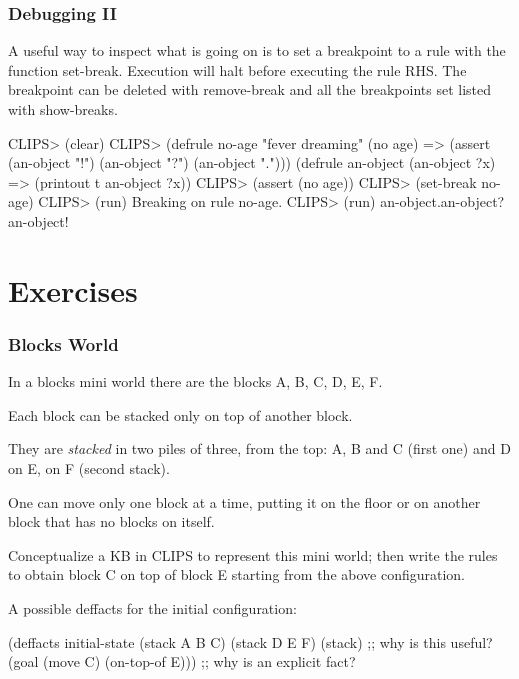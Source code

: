 \documentclass[xcolor={usenames,dvipsnames,svgnames}, compress]{beamer}
\begin{document}
\begin{frame}[fragile]
  \frametitle{Debugging II}
  A useful way to inspect what is going on is to set a breakpoint to a
  rule with the function \textsf{set-break}. Execution will halt
  before executing the rule RHS. The breakpoint can be deleted with
  \textsf{remove-break} and all the breakpoints set listed with
  \textsf{show-breaks}.
  \begin{clips-code}
    CLIPS> (clear)
    CLIPS> (defrule no-age
               "fever dreaming"
               (no age)
               =>
               (assert (an-object "!") (an-object "?") (an-object
               ".")))
           (defrule an-object
               (an-object ?x)
               =>
               (printout t an-object ?x))
   CLIPS> (assert (no age))
   CLIPS> (set-break no-age)
   CLIPS> (run)
   Breaking on rule no-age.
   CLIPS> (run)
   an-object.an-object?an-object!
  \end{clips-code}
\end{frame}

\section{ Exercises}
{
  \begin{frame}
    \sectionpage
  \end{frame}
}

\begin{frame}[fragile]
  \frametitle{Blocks World}
  In a blocks mini world there are the blocks A, B, C, D, E, F.\par
  Each block can be stacked only on top of another block.\par
  
  They are \emph{stacked} in two piles of three, from the top: A, B
  and C (first one) and D on E, on F (second stack).\par\bigskip

  One can move only one block at a time, putting it on the floor or on
  another block that has no blocks on itself.\par
  Conceptualize a KB in CLIPS to represent this mini world; then write
  the rules to obtain block C on top of block E starting from the
  above configuration.\bigskip

  A possible deffacts for the initial configuration:
  \begin{clips-code}[numbers=none]
    (deffacts initial-state
       (stack A B C)
       (stack D E F)
       (stack) ;; why is this useful?
       (goal (move C) (on-top-of E))) ;; why is an explicit fact?
  \end{clips-code}
\end{frame}
\end{document}

